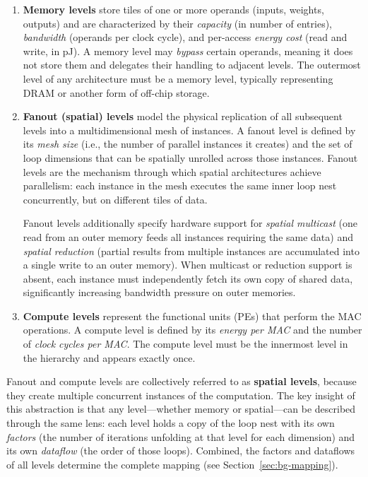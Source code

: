 \begin{enumerate}
  \item \textbf{Memory levels} store tiles of one or more operands
    (inputs, weights, outputs) and are characterized by their
    \emph{capacity} (in number of entries), \emph{bandwidth} (operands
    per clock cycle), and per-access \emph{energy cost} (read and write,
    in pJ).
    A memory level may \emph{bypass} certain operands, meaning it does
    not store them and delegates their handling to adjacent levels.
    The outermost level of any architecture must be a memory level,
    typically representing DRAM or another form of off-chip storage.

  \item \textbf{Fanout (spatial) levels} model the physical replication
    of all subsequent levels into a multidimensional mesh of instances.
    A fanout level is defined by its \emph{mesh size} (i.e., the number
    of parallel instances it creates) and the set of loop dimensions that
    can be spatially unrolled across those instances.
    Fanout levels are the mechanism through which spatial architectures
    achieve parallelism: each instance in the mesh executes the same
    inner loop nest concurrently, but on different tiles of data.

    Fanout levels additionally specify hardware support for
    \emph{spatial multicast} (one read from an outer memory feeds all
    instances requiring the same data) and \emph{spatial reduction}
    (partial results from multiple instances are accumulated into a
    single write to an outer memory).
    When multicast or reduction support is absent, each instance must
    independently fetch its own copy of shared data, significantly
    increasing bandwidth pressure on outer memories.

  \item \textbf{Compute levels} represent the functional units (PEs)
    that perform the MAC operations.
    A compute level is defined by its \emph{energy per MAC} and the
    number of \emph{clock cycles per MAC}.
    The compute level must be the innermost level in the hierarchy and
    appears exactly once.
\end{enumerate}

Fanout and compute levels are collectively referred to as
\textbf{spatial levels}, because they create multiple concurrent
instances of the computation.
The key insight of this abstraction is that any level---whether memory
or spatial---can be described through the same lens: each level holds
a copy of the loop nest with its own \emph{factors} (the number of
iterations unfolding at that level for each dimension) and its own
\emph{dataflow} (the order of those loops).
Combined, the factors and dataflows of all levels determine the
complete mapping (see Section~\ref{sec:bg-mapping}).



